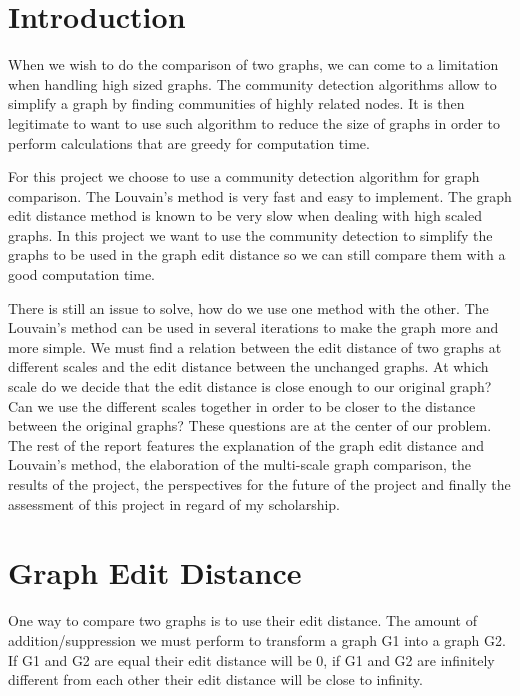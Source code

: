 \documentclass[UTF8, twoside]{EPURapport}
\begin{document}
\chapter{Introduction}

	\hspace{4ex}When we wish to do the comparison of two graphs, we can come to a limitation when handling high sized graphs. The community detection algorithms allow to simplify a graph by finding communities of highly related nodes. It is then legitimate to want to use such algorithm to reduce the size of graphs in order to perform calculations that are greedy for computation time.
	
	For this project we choose to use a community detection algorithm for graph comparison. The Louvain's method is very fast and easy to implement. The graph edit distance method is known to be very slow when dealing with high scaled graphs. In this project we want to use the community detection to simplify the graphs to be used in the graph edit distance so we can still compare them with a good computation time.
	
	There is still an issue to solve, how do we use one method with the other. The Louvain's method can be used in several iterations to make the graph more and more simple. We must find a relation between the edit distance of two graphs at different scales and the edit distance between the unchanged graphs. At which scale do we decide that the edit distance is close enough to our original graph? Can we use the different scales together in order to be closer to the distance between the original graphs? These questions are at the center of our problem.
\\

	The rest of the report features the explanation of the graph edit distance and Louvain's method, the elaboration of the multi-scale graph comparison, the results of the project, the perspectives for the future of the project and finally the assessment of this project in regard of my scholarship.
	
\chapter{Graph Edit Distance}
\label{GED}

	\hspace{4ex}One way to compare two graphs is to use their edit distance. The amount of addition/suppression we must perform to transform a graph G1 into a graph G2. If G1 and G2 are equal their edit distance will be 0, if G1 and G2 are infinitely different from each other their edit distance will be close to infinity.
	
\end{document}
